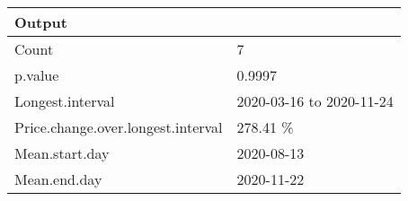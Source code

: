 \begin{table}[!tbp]
\begin{center}
\begin{tabular}{ll}
\hline\hline
\multicolumn{1}{l}{Output}&\multicolumn{1}{c}{}\tabularnewline
\hline
Count&7\tabularnewline
p.value&0.9997\tabularnewline
Longest.interval&2020-03-16 to 2020-11-24\tabularnewline
Price.change.over.longest.interval&278.41 \%\tabularnewline
Mean.start.day&2020-08-13\tabularnewline
Mean.end.day&2020-11-22\tabularnewline
\hline
\end{tabular}\end{center}
\end{table}
